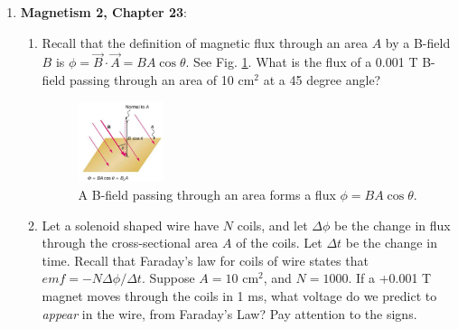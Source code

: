 \documentclass[10pt]{article}
\begin{document}
\begin{enumerate}
\item \textbf{Magnetism 2, Chapter 23}:
\begin{enumerate}
\item Recall that the definition of magnetic flux through an area $A$ by a B-field $B$ is $\phi = \vec{B} \cdot \vec{A} = BA\cos\theta$. See Fig. \ref{fig:magfield2}.  What is the flux of a 0.001 T B-field passing through an area of 10 cm$^2$ at a 45 degree angle?
\begin{figure}[hb]
\centering
\includegraphics[width=0.25\textwidth]{magfield2.png}
\caption{\label{fig:magfield2} A B-field passing through an area forms a flux $\phi = BA\cos\theta$.}
\end{figure}
\item Let a solenoid shaped wire have $N$ coils, and let $\Delta \phi$ be the change in flux through the cross-sectional area $A$ of the coils.  Let $\Delta t$ be the change in time.  Recall that Faraday's law for coils of wire states that $emf = -N \Delta \phi/\Delta t$.  Suppose $A = 10$ cm$^2$, and $N = 1000$.  If a +0.001 T magnet moves through the coils in 1 ms, what voltage do we predict to \textit{appear} in the wire, from Faraday's Law?  Pay attention to the signs.
\end{enumerate}
\end{enumerate}
\end{document}

